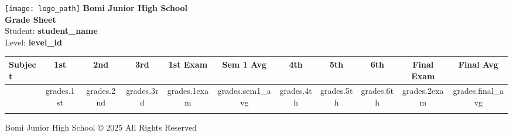 \documentclass[a4paper,12pt]{article}
\begin{document}
\begin{center}
    \texttt{[image: logo\_path]} %
    \vspace{0.2cm}
    \textbf{\Large Bomi Junior High School} \\
    \vspace{0.2cm}
    \textbf{Grade Sheet} \\
    \vspace{0.2cm}
    Student: \textbf{student_name} \\
    Level: \textbf{level_id}
\end{center}

\vspace{1cm}

\begin{table}[h!]
    \centering
    \begin{tabular}{lcccccccccc}
        \toprule
        \rowcolor{bomigreen!20}
        \textbf{Subject} & \textbf{1st} & \textbf{2nd} & \textbf{3rd} & \textbf{1st Exam} & \textbf{Sem 1 Avg} & \textbf{4th} & \textbf{5th} & \textbf{6th} & \textbf{Final Exam} & \textbf{Final Avg} \\
        \midrule
        {%
            \subject.name & \subject.grades.1st & \subject.grades.2nd & \subject.grades.3rd & \subject.grades.1exam & \subject.grades.sem1_avg & \subject.grades.4th & \subject.grades.5th & \subject.grades.6th & \subject.grades.2exam & \subject.grades.final_avg \\
        {%
        \bottomrule
    \end{tabular}
\end{table}

\vspace{1cm}
\begin{center}
    \color{bomigreen}
    Bomi Junior High School © 2025 All Rights Reserved
\end{center}
\end{document}
